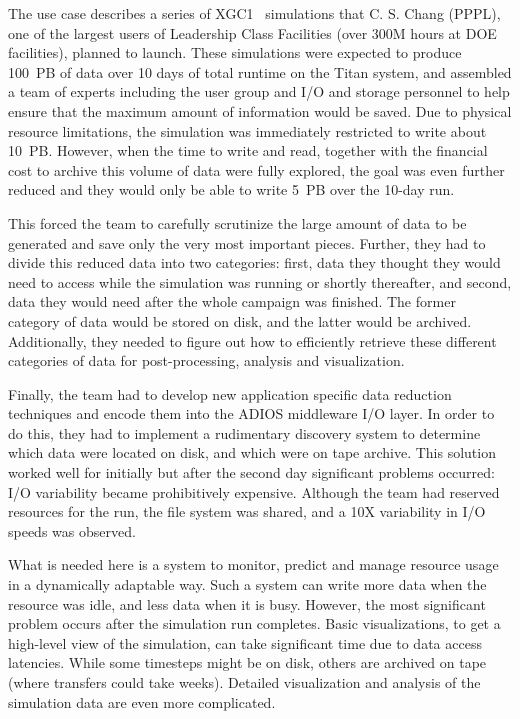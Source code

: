 The use case describes a series of XGC1~\cite{chang2006integrated} simulations that C. S. Chang (PPPL), one of the largest users of Leadership Class Facilities (over 300M hours at DOE facilities), planned to launch. These simulations were expected to produce 100~PB of data over 10 days of total runtime on the Titan system, and assembled a team of experts including the user group and I/O and storage personnel  to help ensure that the maximum amount of information would be saved. 
Due to physical resource limitations, the simulation was immediately restricted to write about 10~PB. However, when the time to write and read, together with the financial cost to archive this volume of data were fully explored, the goal was even further reduced and they would only be able to write 5~PB over the 10-day run.

This forced the team to carefully scrutinize the large amount of data to be generated and save only the very most important pieces. Further, they had to divide this  reduced data into two categories: first, data they thought they would need to access while the simulation was running or shortly thereafter, and second, data they would need after the whole campaign was finished. The former category of data would be stored on disk, and the latter would be archived. Additionally, they needed to figure out how to efficiently retrieve these different categories of data for post-processing, analysis and visualization.

Finally, the team had to develop new application specific data reduction techniques and encode them into the ADIOS middleware I/O layer. In order to do this, they had to implement a rudimentary discovery system to determine which data were located on disk, and which were on tape archive.  This solution worked well for initially but after the second day significant problems occurred: I/O variability became prohibitively expensive. Although the team had reserved resources for the run, the file system was shared, and a 10X variability in I/O speeds was observed. 

What is needed here is a system to monitor, predict and manage resource usage in a dynamically adaptable way. Such a system can write more data when the resource was idle, and less data when it is busy. However, the most significant problem occurs after the simulation run completes. Basic visualizations, to get a high-level view of the simulation, can take significant time due to data access latencies. While some timesteps might be on disk, others are archived on tape (where transfers could take weeks). Detailed visualization and analysis of the simulation data are even more complicated.


